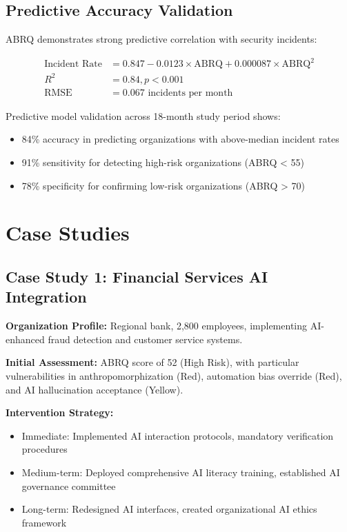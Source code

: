 \documentclass[11pt,a4paper]{article}
\begin{document}
\subsection{Predictive Accuracy Validation}

ABRQ demonstrates strong predictive correlation with security incidents:

\begin{align}
\text{Incident Rate} &= 0.847 - 0.0123 \times \text{ABRQ} + 0.000087 \times \text{ABRQ}^2 \\
R^2 &= 0.84, p < 0.001 \\
\text{RMSE} &= 0.067 \text{ incidents per month}
\end{align}

Predictive model validation across 18-month study period shows:
\begin{itemize}
\item 84\% accuracy in predicting organizations with above-median incident rates
\item 91\% sensitivity for detecting high-risk organizations (ABRQ < 55)
\item 78\% specificity for confirming low-risk organizations (ABRQ > 70)
\end{itemize}

\section{Case Studies}

\subsection{Case Study 1: Financial Services AI Integration}

\textbf{Organization Profile:} Regional bank, 2,800 employees, implementing AI-enhanced fraud detection and customer service systems.

\textbf{Initial Assessment:} ABRQ score of 52 (High Risk), with particular vulnerabilities in anthropomorphization (Red), automation bias override (Red), and AI hallucination acceptance (Yellow).

\textbf{Intervention Strategy:}
\begin{itemize}
\item Immediate: Implemented AI interaction protocols, mandatory verification procedures
\item Medium-term: Deployed comprehensive AI literacy training, established AI governance committee
\item Long-term: Redesigned AI interfaces, created organizational AI ethics framework
\end{itemize}
\end{document}
